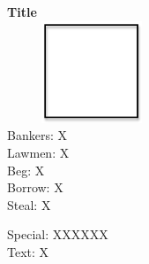 \documentclass{article}
\begin{document}
	\centering
	\textbf{Title}\\
	\includegraphics[width=2in,height=1.2in]{square.png}\\[0.05in]
	Bankers: X\\
	Lawmen: X \\
	Beg: X\\
	Borrow: X\\
	Steal: X\\[0.05in]
	\raggedright
	Special: XXXXXX\\
	\vfill 
	Text: X
\end{document}

